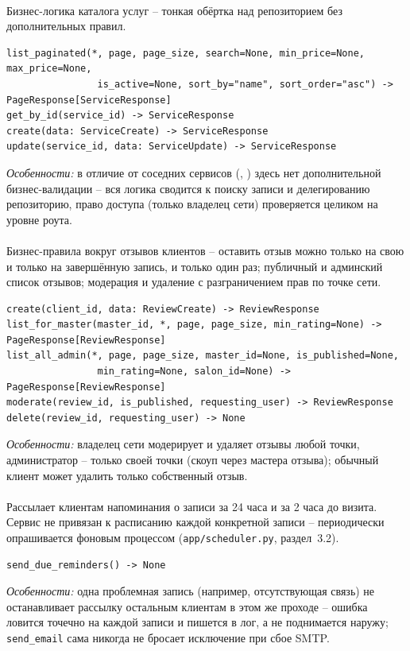 \paragraph{}
Бизнес-логика каталога услуг -- тонкая обёртка над репозиторием без
дополнительных правил.
\begin{verbatim}
list_paginated(*, page, page_size, search=None, min_price=None, max_price=None,
                is_active=None, sort_by="name", sort_order="asc") -> PageResponse[ServiceResponse]
get_by_id(service_id) -> ServiceResponse
create(data: ServiceCreate) -> ServiceResponse
update(service_id, data: ServiceUpdate) -> ServiceResponse
\end{verbatim}
\textit{Особенности:} в отличие от соседних сервисов
(, ) здесь нет дополнительной
бизнес-валидации -- вся логика сводится к поиску записи и делегированию
репозиторию, право доступа (только владелец сети) проверяется целиком на
уровне роута.

\paragraph{}
Бизнес-правила вокруг отзывов клиентов -- оставить отзыв можно только на
свою и только на завершённую запись, и только один раз; публичный и
админский список отзывов; модерация и удаление с разграничением прав по
точке сети.
\begin{verbatim}
create(client_id, data: ReviewCreate) -> ReviewResponse
list_for_master(master_id, *, page, page_size, min_rating=None) -> PageResponse[ReviewResponse]
list_all_admin(*, page, page_size, master_id=None, is_published=None,
                min_rating=None, salon_id=None) -> PageResponse[ReviewResponse]
moderate(review_id, is_published, requesting_user) -> ReviewResponse
delete(review_id, requesting_user) -> None
\end{verbatim}
\textit{Особенности:} владелец сети модерирует и удаляет отзывы любой
точки, администратор -- только своей точки (скоуп через мастера отзыва);
обычный клиент может удалить только собственный отзыв.

\paragraph{}
Рассылает клиентам напоминания о записи за 24 часа и за 2 часа до
визита. Сервис не привязан к расписанию каждой конкретной записи --
периодически опрашивается фоновым процессом (\texttt{app/scheduler.py},
раздел~3.2).
\begin{verbatim}
send_due_reminders() -> None
\end{verbatim}
\textit{Особенности:} одна проблемная запись (например, отсутствующая
связь) не останавливает рассылку остальным клиентам в этом же проходе --
ошибка ловится точечно на каждой записи и пишется в лог, а не поднимается
наружу; \texttt{send_email} сама никогда не бросает исключение при сбое
SMTP.

